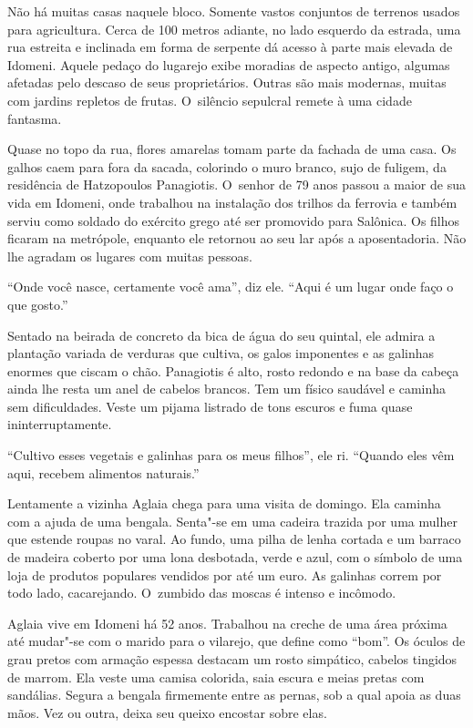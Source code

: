 Não há muitas casas naquele bloco. Somente vastos conjuntos de terrenos
usados para agricultura. Cerca de 100 metros adiante, no lado esquerdo
da estrada, uma rua estreita e inclinada em forma de serpente dá acesso
à parte mais elevada de Idomeni. Aquele pedaço do lugarejo exibe
moradias de aspecto antigo, algumas afetadas pelo descaso de seus
proprietários. Outras são mais modernas, muitas com jardins repletos de
frutas. O~silêncio sepulcral remete à uma
cidade fantasma.

Quase no topo da rua, flores amarelas tomam parte da fachada de uma
casa. Os galhos caem para fora da sacada, colorindo o muro branco, sujo
de fuligem, da residência de Hatzopoulos Panagiotis. O~senhor de 79 anos
passou a maior de sua vida em Idomeni, onde trabalhou na instalação dos
trilhos da ferrovia e também serviu como soldado do exército grego até
ser promovido para Salônica. Os filhos ficaram na metrópole, enquanto
ele retornou ao seu lar após a aposentadoria. Não lhe agradam os lugares
com muitas pessoas.

``Onde você nasce, certamente você ama'', diz ele. ``Aqui é um lugar
onde faço o que gosto.''

Sentado na beirada de concreto da bica de água do seu quintal, ele
admira a plantação variada de verduras que cultiva, os galos imponentes
e as galinhas enormes que ciscam o chão. Panagiotis
é alto, rosto redondo e na base da cabeça ainda lhe resta um anel de
cabelos brancos. Tem um físico saudável e caminha sem dificuldades. Veste
um pijama listrado de tons escuros e fuma quase ininterruptamente.

``Cultivo esses vegetais e galinhas para os meus filhos'', ele ri.
``Quando eles vêm aqui, recebem alimentos naturais.''

Lentamente a vizinha Aglaia chega para uma visita de domingo. Ela
caminha com a ajuda de uma bengala. Senta"-se em uma cadeira trazida por
uma mulher que estende roupas no varal. Ao fundo, uma pilha de lenha
cortada e um barraco de madeira coberto por uma lona desbotada, verde e azul, com o
símbolo de uma loja de produtos populares vendidos por até um euro.
As galinhas correm por todo lado, cacarejando. O~zumbido das
moscas é intenso e incômodo.

Aglaia vive em Idomeni há 52 anos. Trabalhou na creche de uma área
próxima até mudar"-se com o marido para o vilarejo, que define como
``bom''. Os óculos de grau pretos com armação espessa destacam um rosto
simpático, cabelos tingidos de marrom. Ela veste uma camisa colorida,
saia escura e meias pretas com sandálias. Segura a bengala firmemente entre as pernas,
sob a qual apoia as duas mãos. Vez ou outra, deixa seu queixo
encostar sobre elas.

